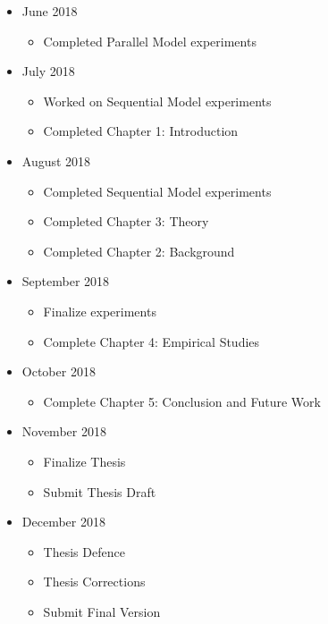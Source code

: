 \documentclass{article}
\begin{document}
	\begin{itemize}
		\item June 2018
		\begin{itemize}
			\item Completed Parallel Model experiments
		\end{itemize}
		\item July 2018
		\begin{itemize}
			\item Worked on Sequential Model experiments
			\item Completed Chapter 1: Introduction
		\end{itemize}
		\item August 2018
		\begin{itemize}
			\item Completed Sequential Model experiments
			\item Completed Chapter 3: Theory
			\item Completed Chapter 2: Background
		\end{itemize}
		\item September 2018
			\begin{itemize}
				\item Finalize experiments
				\item Complete Chapter 4: Empirical Studies
			\end{itemize}
		\item October 2018
			\begin{itemize}
				\item Complete Chapter 5: Conclusion and Future Work
			\end{itemize}
		\item November 2018
			\begin{itemize}
				\item Finalize Thesis
				\item Submit Thesis Draft
			\end{itemize}
		\item December 2018
		\begin{itemize}
			\item Thesis Defence
			\item Thesis Corrections
			\item Submit Final Version
		\end{itemize}
	\end{itemize}
	
	
	
	
\end{document}
